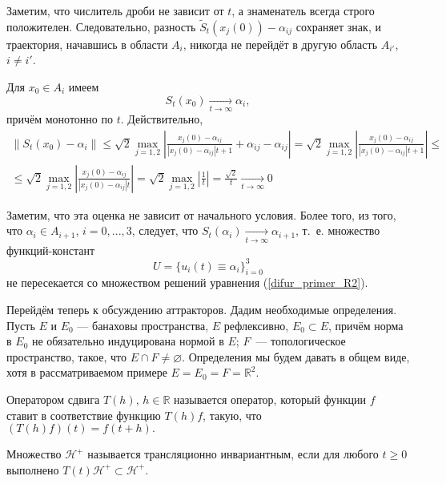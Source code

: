 Заметим, что числитель дроби не зависит от $t$, а знаменатель всегда строго положителен.
Следовательно, разность $\tilde{S}_t(x_j(0)) - \alpha_{ij}$ сохраняет знак,
и траектория, начавшись в области $A_i$, никогда не перейдёт в другую область $A_{i'}$, $i \neq i'$.

Для $x_0 \in A_i$ имеем
\begin{equation}\label{primer_R2_stremlenie}
	S_t(x_0) \xrightarrow[t \to \infty]{} \alpha_{i},
\end{equation}
причём монотонно по $t$.
Действительно,
\begin{multline}
	\|S_t(x_0) - \alpha_i\| \leq
	\sqrt{2} \max_{j=1,2} \left| \frac{x_{j}(0)-\alpha_{ij}}{|x_{j}(0)-\alpha_{ij}|t+1} + \alpha_{ij} - \alpha_{ij}  \right| =
	\sqrt{2} \max_{j=1,2} \left| \frac{x_{j}(0)-\alpha_{ij}}{|x_{j}(0)-\alpha_{ij}|t+1} \right| \leq
	\\ \leq
	\sqrt{2} \max_{j=1,2} \left| \frac{x_{j}(0)-\alpha_{ij}}{|x_{j}(0)-\alpha_{ij}|t} \right| =
	\sqrt{2} \max_{j=1,2} \left| \frac{1}{t} \right| =
	\frac{\sqrt{2}}{t} \xrightarrow[t \to \infty]{} 0
\end{multline}

Заметим, что эта оценка не зависит от начального условия.
Более того, из того, что $\alpha_i \in A_{i+1}$, $i=0,...,3$,
следует, что $S_t(\alpha_i) \xrightarrow[t \to \infty]{} \alpha_{i+1}$,
т.~е. множество функций-констант
$$
	U = \{ u_i(t) \equiv \alpha_i \}_{i=0}^{3}
$$
не пересекается со множеством решений уравнения (\ref{difur_primer_R2}).

Перейдём теперь к обсуждению аттракторов.
Дадим необходимые определения.
Пусть $E$ и $E_0$ --- банаховы пространства, $E$ рефлексивно,
$E_0 \subset E$, причём норма в $E_0$ не обязательно индуцирована нормой в $E$;
$F$~--- топологическое пространство, такое, что $E \cap F \ne \varnothing$.
Определения мы будем давать в общем виде, хотя в рассматриваемом примере
$E=E_0=F=\mathbb{R}^2$.

\begin{definition}
	Оператором сдвига $T(h)$, $h\in\mathbb{R}$ называется оператор, который функции $f$ ставит в соответствие функцию $T(h)f$, такую, что
	$
		(T(h)f)(t)=f(t+h).
	$
\end{definition}

\begin{definition}
	Множество $\mathcal{H}^+$ называется трансляционно инвариантным, если
	для любого $t \geq 0$ выполнено $T(t)\mathcal{H}^+ \subset \mathcal{H}^+$.
\end{definition}


